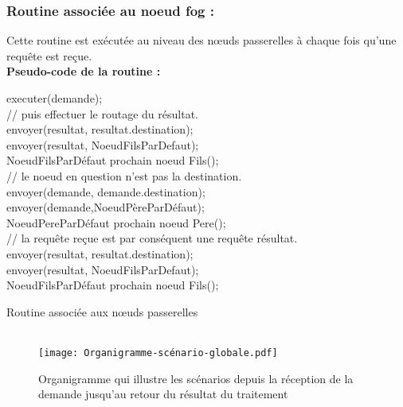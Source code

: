 \subsubsection{Routine associée au noeud fog :}
Cette routine est exécutée au niveau des nœuds passerelles à chaque fois qu’une requête est reçue.\\
\textbf{Pseudo-code de la routine :}\\
\begin{algorithm}[H]
 {  
    { executer(demande);\\
     // puis effectuer le routage du résultat.\\
     {envoyer(resultat, resultat.destination);\\}
     {envoyer(resultat, NoeudFilsParDefaut);\\
     NoeudFilsParDéfaut \gets prochain noeud Fils();\\}
    }
    {  // le noeud en question n’est pas la destination.\\
     {envoyer(demande, demande.destination);\\}
     {envoyer(demande,NoeudPèreParDéfaut);\\
     NoeudPereParDéfaut \gets prochain noeud Pere();\\}
   }
 }
 { // la requête reçue est par conséquent une requête résultat.\\
   {envoyer(resultat, resultat.destination);\\}
   {envoyer(resultat, NoeudFilsParDefaut);\\
   NoeudFilsParDéfaut \gets prochain noeud Fils();\\}
 }
 \caption{Routine associée aux nœuds passerelles\\ \\}
\end{algorithm}
\begin{figure}[H]
    \centering
    \texttt{[image: Organigramme-scénario-globale.pdf]}
    \caption{Organigramme qui illustre les scénarios depuis la réception de la demande jusqu’au retour du résultat du traitement}
    \label{fig:Organigrame_scénario_globale}
\end{figure}


